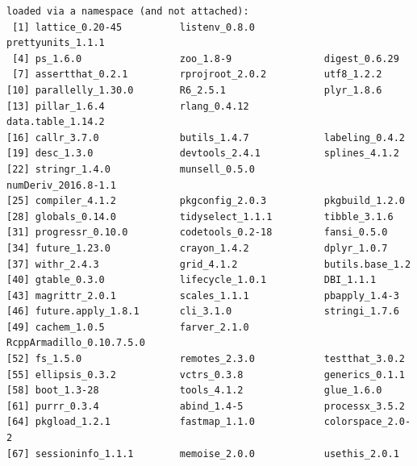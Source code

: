 \documentclass[12pt]{article}
\begin{document}
\begin{verbatim}
loaded via a namespace (and not attached):
 [1] lattice_0.20-45          listenv_0.8.0            prettyunits_1.1.1       
 [4] ps_1.6.0                 zoo_1.8-9                digest_0.6.29           
 [7] assertthat_0.2.1         rprojroot_2.0.2          utf8_1.2.2              
[10] parallelly_1.30.0        R6_2.5.1                 plyr_1.8.6              
[13] pillar_1.6.4             rlang_0.4.12             data.table_1.14.2       
[16] callr_3.7.0              butils_1.4.7             labeling_0.4.2          
[19] desc_1.3.0               devtools_2.4.1           splines_4.1.2           
[22] stringr_1.4.0            munsell_0.5.0            numDeriv_2016.8-1.1     
[25] compiler_4.1.2           pkgconfig_2.0.3          pkgbuild_1.2.0          
[28] globals_0.14.0           tidyselect_1.1.1         tibble_3.1.6            
[31] progressr_0.10.0         codetools_0.2-18         fansi_0.5.0             
[34] future_1.23.0            crayon_1.4.2             dplyr_1.0.7             
[37] withr_2.4.3              grid_4.1.2               butils.base_1.2         
[40] gtable_0.3.0             lifecycle_1.0.1          DBI_1.1.1               
[43] magrittr_2.0.1           scales_1.1.1             pbapply_1.4-3           
[46] future.apply_1.8.1       cli_3.1.0                stringi_1.7.6           
[49] cachem_1.0.5             farver_2.1.0             RcppArmadillo_0.10.7.5.0
[52] fs_1.5.0                 remotes_2.3.0            testthat_3.0.2          
[55] ellipsis_0.3.2           vctrs_0.3.8              generics_0.1.1          
[58] boot_1.3-28              tools_4.1.2              glue_1.6.0              
[61] purrr_0.3.4              abind_1.4-5              processx_3.5.2          
[64] pkgload_1.2.1            fastmap_1.1.0            colorspace_2.0-2        
[67] sessioninfo_1.1.1        memoise_2.0.0            usethis_2.0.1
\end{verbatim}
\end{document}
